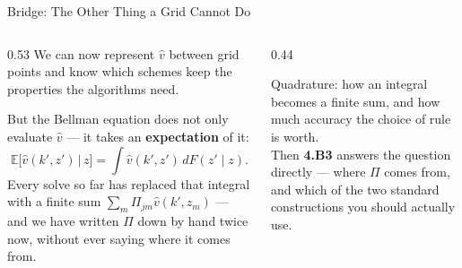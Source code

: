 \begin{frame}{Bridge: The Other Thing a Grid Cannot Do}
\begin{columns}[T]
\begin{column}{0.53\textwidth}
\small
We can now represent $\hat v$ between grid points and know which schemes keep the properties the algorithms need.
\medskip

But the Bellman equation does not only evaluate $\hat v$ --- it takes an \textbf{expectation} of it:
\[
  \mathbb{E}\big[\hat v(k',z')\,\big|\,z\big]=\int \hat v(k',z')\,dF(z'\mid z).
\]
Every solve so far has replaced that integral with a finite sum $\sum_m \Pi_{jm}\hat v(k',z_m)$ --- and we have written $\Pi$ down by hand twice now, without ever saying where it comes from.
\end{column}
\begin{column}{0.44\textwidth}
\begin{conceptbox}[title=\textbf{Next (4.B2)}]\small
Quadrature: how an integral becomes a finite sum, and how much accuracy the choice of rule is worth.\\[1mm]
Then \textbf{4.B3} answers the question directly --- where $\Pi$ comes from, and which of the two standard constructions you should actually use.
\end{conceptbox}
\end{column}
\end{columns}
\end{frame}


